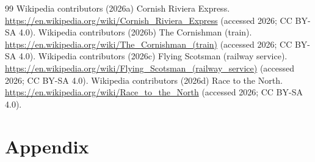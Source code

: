 \documentclass[11pt,a4paper]{article}
\begin{document}
\begin{thebibliography}{99}
 Wikipedia contributors (2026a) Cornish Riviera Express. \url{https://en.wikipedia.org/wiki/Cornish_Riviera_Express} (accessed 2026; CC BY-SA 4.0).
 Wikipedia contributors (2026b) The Cornishman (train). \url{https://en.wikipedia.org/wiki/The_Cornishman_(train)} (accessed 2026; CC BY-SA 4.0).
 Wikipedia contributors (2026c) Flying Scotsman (railway service). \url{https://en.wikipedia.org/wiki/Flying_Scotsman_(railway_service)} (accessed 2026; CC BY-SA 4.0).
 Wikipedia contributors (2026d) Race to the North. \url{https://en.wikipedia.org/wiki/Race_to_the_North} (accessed 2026; CC BY-SA 4.0).
\end{thebibliography}


\clearpage
\appendix
\section{Appendix}
\end{document}
